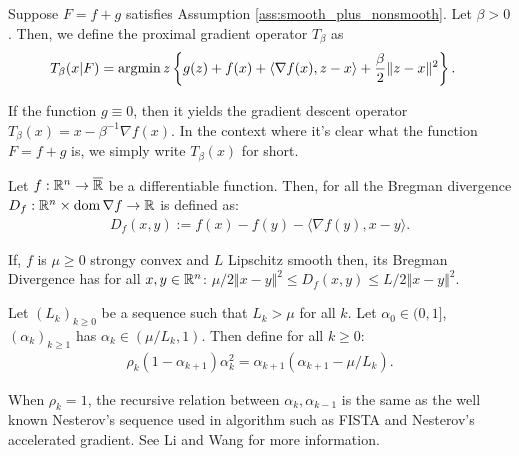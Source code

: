 \documentclass[12pt]{article}
\begin{document}
        \begin{definition}
            Suppose $F = f + g$ satisfies Assumption \ref{ass:smooth_plus_nonsmooth}. 
            Let $\beta > 0$. 
            Then, we define the proximal gradient operator $T_{\beta}$ as 
            \begin{align*}
                T_\beta (x | F) &= \mathop{\rm argmin}\limits{z} \left\lbrace
                    g(z) + f(x) + \langle \nabla f(x), z - x\rangle + \frac{\beta}{2}\Vert z - x\Vert^2
                \right\rbrace. 
            \end{align*}
        \end{definition}
        \begin{remark}
            If the function $g \equiv 0$, then it yields the gradient descent operator $T_\beta(x) = x - \beta^{-1}\nabla f(x)$. 
            In the context where it's clear what the function $F = f + g$ is, we simply write $T_\beta(x)$ for short. 
        \end{remark}

        \begin{definition}
            Let $f:\mathbb R^n \rightarrow \overline {\mathbb R}$ be a differentiable function. 
            Then, for all the Bregman divergence $D_f: \mathbb R^n \times \operatorname{dom}\nabla f \rightarrow \mathbb R$ is defined as: 
            \begin{align*}
                D_f(x, y) := f(x) - f(y) - \langle \nabla f(y), x - y\rangle. 
            \end{align*}
        \end{definition}
        \begin{remark}
            If, $f$ is $\mu \ge 0$ strongy convex and $L$ Lipschitz smooth then, its Bregman Divergence has for all $x, y \in \mathbb R^n$: $\mu/2 \Vert x - y\Vert^2 \le D_f(x, y) \le L/2 \Vert x - y\Vert^2$. 
        \end{remark}

        \begin{definition}\label{def:rwapg-seq}
            Let $(L_k)_{k \ge 0}$ be a sequence such that $L_k > \mu$ for all $k$. 
            Let $\alpha_0 \in (0, 1]$, $(\alpha_k)_{k \ge 1}$ has $\alpha_k \in (\mu/ L_k, 1)$. 
            Then define for all $k \ge 0$: 
            \begin{align*}
                \rho_k(1 - \alpha_{k + 1})\alpha_k^2 = \alpha_{k + 1}(\alpha_{k + 1} - \mu/L_k). 
            \end{align*}
        \end{definition}
        \begin{remark}
            When $\rho_k = 1$, the recursive relation between $\alpha_k, \alpha_{k - 1}$ is the same as the well known Nesterov's sequence used in algorithm such as FISTA and Nesterov's accelerated gradient. 
            See Li and Wang \cite{li_relaxed_2025} for more information. 
        \end{remark}
        
\end{document}
